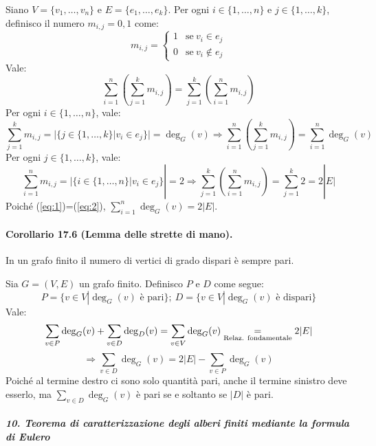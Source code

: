 \documentclass[12pt, a4paper]{report}
\theoremstyle{definition}
\begin{document}
\begin{demonstration}
    Siano $V=\{v_1,\dots,v_n\}$ e $E=\{e_1,\dots,e_k\}$. Per ogni $i\in\{1,\dots,n\}$
    e $j\in\{1,\dots,k\}$, definisco il numero $m_{i,j}={0,1}$ come:
    \[m_{i,j}=\begin{cases}
        1 & \text{se}\ v_i\in e_j\\
        0 & \text{se}\ v_i\notin e_j
    \end{cases}\]
    Vale:
    \[\sum_{i=1}^n\left(\sum_{j=1}^km_{i,j}\right)=\sum_{j=1}^k\left(\sum_{i=1}
    ^nm_{i,j}\right)\]
    Per ogni $i\in\{1,\dots,n\}$, vale:
    \begin{equation}\label{eq:1}
        \sum_{j=1}^km_{i,j}=|\{j\in\{1,\dots,k\}|v_i\in e_j\}|=\deg_G(v)
        \Rightarrow
        \sum_{i=1}^n\left(\sum_{j=1}^km_{i,j}\right)=\sum_{i=1}^n\deg_G(v)
    \end{equation}
    Per ogni $j\in\{1,\dots,k\}$, vale:
    \begin{equation}\label{eq:2}
        \sum_{i=1}^nm_{i,j}=|\{i\in\{1,\dots,n\}|v_i\in e_j\}|=2
        \Rightarrow
        \sum_{j=1}^k\left(\sum_{i=1}^nm_{i,j}\right)=\sum_{j=1}^k2=2|E|
    \end{equation}
    Poiché (\ref{eq:1})=(\ref{eq:2}), $\sum_{i=1}^n\deg_G(v)=2|E|$.
\end{demonstration}

\paragraph{Corollario 17.6 (Lemma delle strette di mano).}
In un grafo finito il numero di vertici di grado dispari è sempre pari.

\begin{demonstration}
    Sia $G=(V,E)$ un grafo finito. Definisco $P$ e $D$ come segue:
    \[P=\{v\in V|\deg_G(v) \text{ è pari}\};\ D=\{v\in V|\deg_G(v) \text{ è dispari}\}\]
    Vale:
    \[\sum_{v\in P}\deg_G(v)+\sum_{v\in D}\deg_D(v)=\sum_{v\in V}\deg_G(v)
    \underrel{=}{\text{Relaz. fondamentale}}2|E|\]
    \[\Rightarrow\sum_{v\in D}\deg_G(v)=2|E|-\sum_{v\in P}\deg_G(v)\]
    Poiché al termine destro ci sono solo quantità pari, anche il termine sinistro
    deve esserlo, ma $\sum_{v\in D}\deg_G(v)$ è pari se e soltanto se $|D|$ è pari.
\end{demonstration}

\newpage
\paragraph{\emph{10. Teorema di caratterizzazione degli alberi finiti mediante
la formula di Eulero}}
\end{document}
